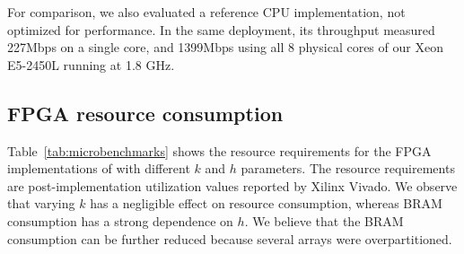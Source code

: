 For comparison, we also evaluated a reference CPU implementation, not 
optimized for performance. In the same deployment, its throughput 
measured 227Mbps on a single core, and 1399Mbps using all 8 physical cores of
our Xeon E5-2450L running at 1.8 GHz.




\subsection{FPGA resource consumption}
Table~\ref{tab:microbenchmarks} shows the resource requirements for the FPGA implementations of
\OurSys with different $k$ and $h$ parameters.  The resource requirements are
post-implementation utilization values reported by Xilinx Vivado.  We observe
that varying $k$ has a negligible effect on resource consumption, whereas BRAM
consumption has a strong dependence on $h$.  We believe that the BRAM consumption
can be further reduced because several arrays were overpartitioned.

